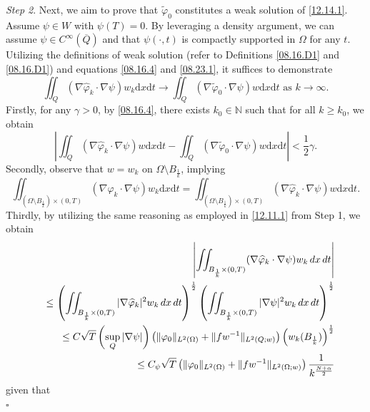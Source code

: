 \documentclass[11pt]{article}
\def\crr{\cr\noalign{\vskip-0.0mm}}
\newenvironment{proof}{{\bf {Proof.}}}{\hfill $\square$}
\numberwithin{equation}{section}
\def\bf{\textbf}
\begin{document}
\begin{proof}
 {\it Step 2}. Next, we aim to prove that $\widetilde{\varphi}_0$ constitutes a weak solution of \eqref{12.14.1}.
Assume $\psi\in W$ with $\psi(T)=0$. By leveraging a density argument, we can assume $\psi\in C^\infty(\overline{Q})$ and that $\psi(\cdot, t)$ is compactly supported in $\Omega$ for any $t$. Utilizing the definitions of weak solution (refer to Definitions \ref{08.16.D1} and \ref{08.16.D1}) and equations \eqref{08.16.4} and \eqref{08.23.1}, it suffices to demonstrate
\begin{equation}\label{08.16.5}
\iint_Q(\nabla\widehat{\varphi}_k\cdot \nabla\psi)w_k\mathrm{d} x\mathrm{d} t\to \iint_Q(\nabla\widetilde{\varphi}_0\cdot\nabla\psi)w\mathrm{d} x\mathrm{d} t   \text{  as } k\to \infty.
\end{equation}
Firstly, for any $\gamma>0$, by \eqref{08.16.4}, there exists $k_0\in\mathbb{N}$ such that for all $k\geq k_0$, we obtain
\begin{equation}\label{08.16.6}
\left|\iint_Q(\nabla\widehat{\varphi}_k\cdot\nabla\psi)w\mathrm{d} x\mathrm{d} t-\iint_Q(\nabla\widetilde{\varphi}_0\cdot\nabla\psi)w\mathrm{d} x\mathrm{d} t\right|<\frac{1}{2}\gamma.
\end{equation}
Secondly, observe that $w=w_k$ on $\Omega\setminus B_{\frac{1}{k}}$, implying
\begin{equation}\label{08.16.7}
\iint_{(\Omega\setminus B_{\frac{1}{k}})\times (0,T)}(\nabla\widehat{\varphi}_k\cdot\nabla\psi)w_k\mathrm{d} x\mathrm{d} t=\iint_{(\Omega\setminus B_{\frac{1}{k}})\times (0,T)}(\nabla \widehat{\varphi}_k\cdot\nabla\psi)w\mathrm{d} x\mathrm{d} t.
\end{equation}
 Thirdly, by utilizing the same reasoning as employed in \eqref{12.11.1} from Step 1, we obtain
\begin{eqnarray}\label{08.16.9}
&&\left|\iint_{B_{\frac{1}{k}} \times (0,T)} (\nabla\widehat{\varphi}_k \cdot \nabla\psi) w_k \, dx \, dt\right| \crr
&&\leq \left(\iint_{B_{\frac{1}{k}} \times (0,T)} |\nabla\widehat{\varphi}_k|^2 w_k \, dx \, dt\right)^{\frac{1}{2}} \left(\iint_{B_{\frac{1}{k}} \times (0,T)} |\nabla\psi|^2 w_k \, dx \, dt\right)^{\frac{1}{2}} \crr
&&\leq C\sqrt{T} \left(\sup_{Q} |\nabla\psi|\right) \left(\|\varphi_0\|_{L^2(\Omega)} + \|f w^{-1}\|_{L^2(Q; w)}\right) \left(w_k(B_{\frac{1}{k}})\right)^{\frac{1}{2}} \crr
&&\leq C_\psi \sqrt{T} \left(\|\varphi_0\|_{L^2(\Omega)} + \|f w^{-1}\|_{L^2(\Omega; w)}\right) \frac{1}{k^{\frac{N+\alpha}{2}}}
\end{eqnarray}
given that
\begin{equation*}

\end{equation*}
\end{proof}
\end{document}
